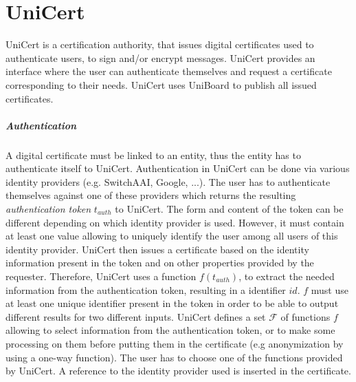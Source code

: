 \documentclass[bibtotoc,halfparskip,oneside]{scrreprt}
\begin{document}
	\chapter{UniCert}
	
	UniCert is a certification authority, that issues digital certificates used to authenticate users, to sign and/or encrypt messages. UniCert provides an interface where the user can authenticate themselves and request a certificate corresponding to their needs. UniCert uses UniBoard to publish all issued certificates.
	
	\paragraph*{Authentication} A digital certificate must be linked to an entity, thus the entity has to authenticate itself to UniCert. Authentication in UniCert can be done via various identity providers (e.g. SwitchAAI, Google, ...). The user has to authenticate themselves against one of these providers which returns the resulting \emph{authentication token} $t_{auth}$ to UniCert. The form and content of the token can be different depending on which identity provider is used. However, it must contain at least one value allowing to uniquely identify the user among all users of this identity provider.
	UniCert then issues a certificate based on the identity information present in the token and on other properties provided by the requester.  Therefore, UniCert uses a function $\mathit{f}(t_{auth})$, to extract the needed information from the authentication token, resulting in a identifier $id$. $\mathit{f}$ must use at least one unique identifier present in the token in order to be able to output different results for two different inputs. UniCert defines a set $\mathcal{F}$ of functions $\mathit{f}$ allowing to select information from the authentication token, or to make some processing on them before putting them in the certificate (e.g anonymization by using a one-way function). The user has to choose one of the functions provided by UniCert. A reference to the identity provider used is inserted in the certificate.
	
	
\end{document}
